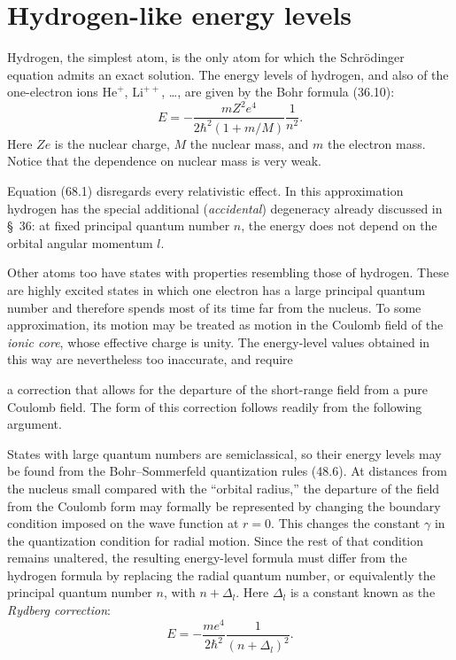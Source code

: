 \section{Hydrogen-like energy levels}

Hydrogen, the simplest atom, is the only atom for which the Schrödinger
equation admits an exact solution. The energy levels of hydrogen, and also of
the one-electron ions $\mathrm{He}^+$, $\mathrm{Li}^{++}$, \ldots, are given by
the Bohr formula (36.10):
\begin{equation}
E=-\frac{mZ^2e^4}{2\hbar^2(1+m/M)}\frac1{n^2}.
\tag{68.1}
\end{equation}
Here $Ze$ is the nuclear charge, $M$ the nuclear mass, and $m$ the electron
mass. Notice that the dependence on nuclear mass is very weak.

Equation (68.1) disregards every relativistic effect. In this approximation
hydrogen has the special additional (\emph{accidental}) degeneracy already
discussed in \S~36: at fixed principal quantum number $n$, the energy does not
depend on the orbital angular momentum $l$.

Other atoms too have states with properties resembling those of hydrogen.
These are highly excited states in which one electron has a large principal
quantum number and therefore spends most of its time far from the nucleus. To
some approximation, its motion may be treated as motion in the Coulomb field
of the \emph{ionic core}, whose effective charge is unity. The energy-level
values obtained in this way are nevertheless too inaccurate, and require

a correction that allows for the departure of the short-range field from a
pure Coulomb field. The form of this correction follows readily from the
following argument.

States with large quantum numbers are semiclassical, so their energy levels
may be found from the Bohr--Sommerfeld quantization rules (48.6). At distances
from the nucleus small compared with the ``orbital radius,'' the departure of
the field from the Coulomb form may formally be represented by changing the
boundary condition imposed on the wave function at $r=0$. This changes the
constant $\gamma$ in the quantization condition for radial motion. Since the
rest of that condition remains unaltered, the resulting energy-level formula
must differ from the hydrogen formula by replacing the radial quantum number,
or equivalently the principal quantum number $n$, with $n+\Delta_l$. Here
$\Delta_l$ is a constant known as the \emph{Rydberg correction}:
\begin{equation}
E=-\frac{me^4}{2\hbar^2}\frac1{(n+\Delta_l)^2}.
\tag{68.2}
\end{equation}

